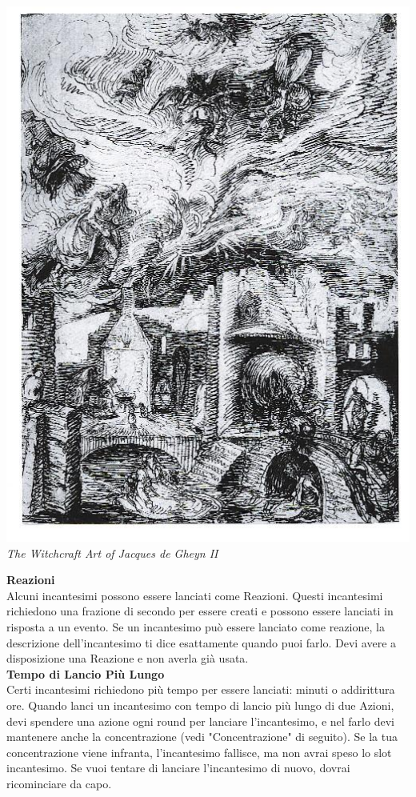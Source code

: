 \begin{multicols}{2}
\begin{center}
	\includegraphics[width=0.9\linewidth]{immagini/Hex32.jpg}
\textit{The Witchcraft Art of Jacques de Gheyn II}
\end{center}

\textbf{Reazioni}\\
Alcuni incantesimi possono essere lanciati come Reazioni. Questi incantesimi richiedono una frazione di secondo per essere creati e possono essere lanciati in risposta a un evento. Se un incantesimo può essere lanciato come reazione, la descrizione dell'incantesimo ti dice esattamente quando puoi farlo. Devi avere a disposizione una Reazione e non averla già usata.\\

\textbf{Tempo di Lancio Più Lungo}\\
Certi incantesimi richiedono più tempo per essere lanciati: minuti o addirittura ore. Quando lanci un incantesimo con tempo di lancio più lungo di due Azioni, devi spendere una azione ogni round per lanciare l'incantesimo, e nel farlo devi mantenere anche la concentrazione (vedi "Concentrazione" di seguito). Se la tua concentrazione viene infranta, l'incantesimo fallisce, ma non avrai speso lo slot incantesimo. Se vuoi tentare di lanciare l'incantesimo di nuovo, dovrai ricominciare da capo.\\


\end{multicols}
